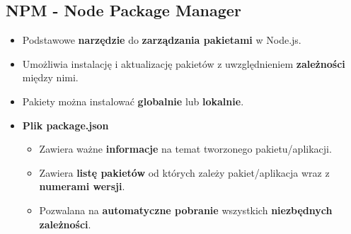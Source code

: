\documentclass[../main.tex]{subfiles}
\begin{document}
    \subsection{NPM - Node Package Manager}
    \begin{itemize}
        \item Podstawowe \textbf{narzędzie} do \textbf{zarządzania pakietami} w Node.js.
        \item Umożliwia instalację i aktualizację pakietów z uwzględnieniem \textbf{zależności} między nimi.
        \item Pakiety można instalować \textbf{globalnie} lub \textbf{lokalnie}.
        \item \textbf{Plik package.json}
        \begin{itemize}
            \item Zawiera ważne \textbf{informacje} na temat tworzonego pakietu/aplikacji.
            \item Zawiera \textbf{listę pakietów} od których zależy pakiet/aplikacja wraz z \textbf{numerami wersji}.
            \item Pozwalana na \textbf{automatyczne pobranie} wszystkich \textbf{niezbędnych zależności}.
        \end{itemize}
    \end{itemize}
\end{document}
